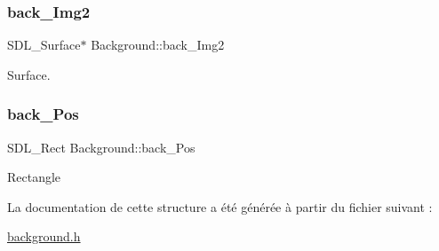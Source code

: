 \subsubsection{\texorpdfstring{back\+\_\+\+Img2}{back\_Img2}}
{\footnotesize\ttfamily S\+D\+L\+\_\+\+Surface$\ast$ Background\+::back\+\_\+\+Img2}

Surface. \mbox{\label{structBackground_a4921effe7d9612c8a1870bee947e4441}} 
\subsubsection{\texorpdfstring{back\+\_\+\+Pos}{back\_Pos}}
{\footnotesize\ttfamily S\+D\+L\+\_\+\+Rect Background\+::back\+\_\+\+Pos}

Rectangle 

La documentation de cette structure a été générée à partir du fichier suivant \+:\begin{DoxyCompactItemize}
\item 
\hyperlink{background_8h}{background.\+h}\end{DoxyCompactItemize}

